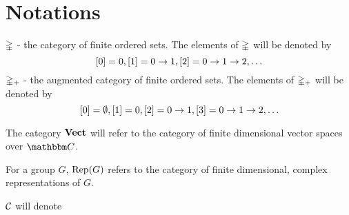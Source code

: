 \section{Notations}
$\mathbb{\Delta}$ - the category of finite ordered sets. The elements of $\mathbb{\Delta}$ will be denoted by \[\left[ 0 \right]=0, \left[ 1 \right]=0\rightarrow 1, \left[ 2 \right]=0\rightarrow 1\rightarrow 2, \ldots\]
$\mathbb{\Delta}_+$ - the augmented category of finite ordered sets. The elements of $\mathbb{\Delta}_+$ will be denoted by \[\left[ 0 \right]=\emptyset, \left[ 1 \right]=0, \left[ 2 \right]=0\rightarrow 1, \left[ 3 \right]=0\rightarrow 1\rightarrow 2, \ldots\]

The category $\mathbf{Vect}$ will refer to the category of finite dimensional vector spaces over $\CC$.

For a group $G$, $\operatorname{Rep}(G)$ refers to the category of finite dimensional, complex representations of $G$.

$\mathcal{C}$ will denote  